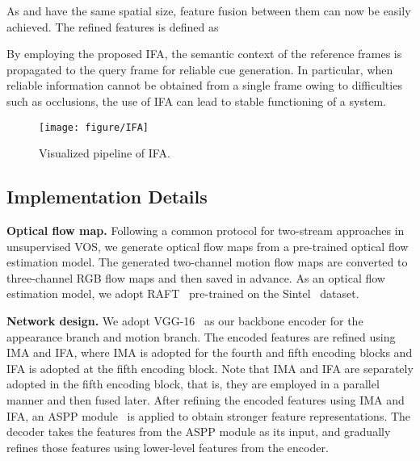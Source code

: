 \documentclass[10pt,twocolumn,letterpaper]{article}
\begin{document}
As  and  have the same spatial size, feature fusion between them can now be easily achieved. The refined features  is defined as

By employing the proposed IFA, the semantic context of the reference frames is propagated to the query frame for reliable cue generation. In particular, when reliable information cannot be obtained from a single frame owing to difficulties such as occlusions, the use of IFA can lead to stable functioning of a system. 



\begin{figure}[t]
\centering
\texttt{[image: figure/IFA]}
\caption{Visualized pipeline of IFA.}
\label{figure4}
\end{figure}


\subsection{Implementation Details}
\noindent\textbf{Optical flow map.} Following a common protocol for two-stream approaches in unsupervised VOS, we generate optical flow maps from a pre-trained optical flow estimation model. The generated two-channel motion flow maps are converted to three-channel RGB flow maps and then saved in advance. As an optical flow estimation model, we adopt RAFT~\cite{RAFT} pre-trained on the Sintel~\cite{Sintel} dataset. 


\vspace{1mm}
\noindent\textbf{Network design.} We adopt VGG-16~\cite{vgg} as our backbone encoder for the appearance branch and motion branch. The encoded features are refined using IMA and IFA, where IMA is adopted for the fourth and fifth encoding blocks and IFA is adopted at the fifth encoding block. Note that IMA and IFA are separately adopted in the fifth encoding block, that is, they are employed in a parallel manner and then fused later. After refining the encoded features using IMA and IFA, an ASPP module~\cite{ASPP} is applied to obtain stronger feature representations. The decoder takes the features from the ASPP module as its input, and gradually refines those features using lower-level features from the encoder.
\end{document}
